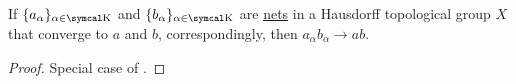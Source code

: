 \begin{proposition}\label{thm:limits_are_topological_group_homomorphisms}
  If \( \{ a_\alpha \}_{\alpha \in \CK} \) and \( \{ b_\alpha \}_{\alpha \in \CK} \) are \hyperref[def:topological_net]{nets} in a Hausdorff topological group \( X \) that converge to \( a \) and \( b \), correspondingly, then \( a_\alpha b_\alpha \to a b \).
\end{proposition}
\begin{proof}
  Special case of .
\end{proof}
